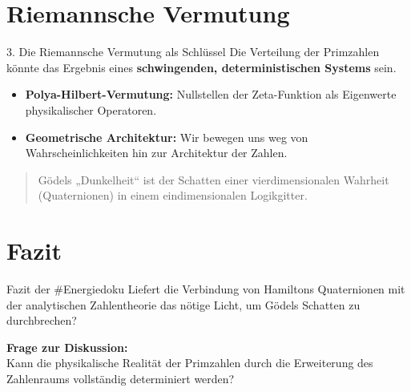 \documentclass{beamer}
\begin{document}
	\section{Riemannsche Vermutung}
	\begin{frame}{3. Die Riemannsche Vermutung als Schlüssel}
		Die Verteilung der Primzahlen könnte das Ergebnis eines \textbf{schwingenden, deterministischen Systems} sein.
		\begin{itemize}
			\item \textbf{Polya-Hilbert-Vermutung:} Nullstellen der Zeta-Funktion als Eigenwerte physikalischer Operatoren.
			\item \textbf{Geometrische Architektur:} Wir bewegen uns weg von Wahrscheinlichkeiten hin zur Architektur der Zahlen.
		\end{itemize}
		\begin{quote}
			Gödels „Dunkelheit“ ist der Schatten einer vierdimensionalen Wahrheit (Quaternionen) in einem eindimensionalen Logikgitter.
		\end{quote}
	\end{frame}
	
	\section{Fazit}
	\begin{frame}{Fazit der \#Energiedoku}
		Liefert die Verbindung von Hamiltons Quaternionen mit der analytischen Zahlentheorie das nötige Licht, um Gödels Schatten zu durchbrechen?
		
		\vspace{1cm}
		\begin{center}
			\textbf{Frage zur Diskussion:} \\
			Kann die physikalische Realität der Primzahlen durch die Erweiterung des Zahlenraums vollständig determiniert werden?
		\end{center}
	\end{frame}
	
\end{document}
